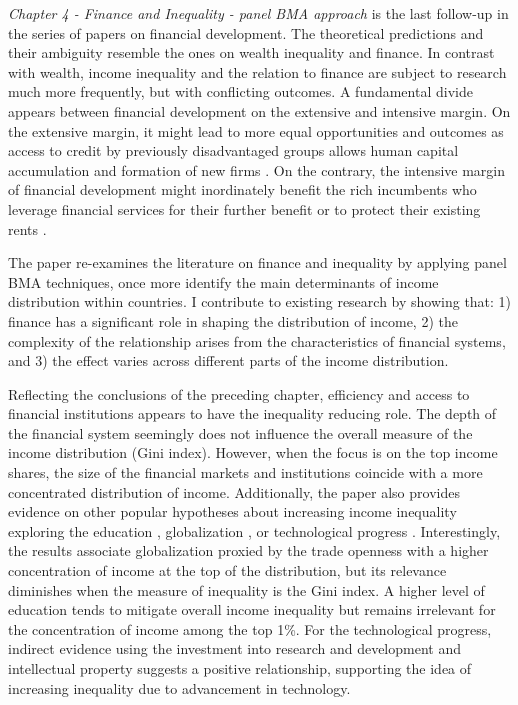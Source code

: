 \begin{refsection}
\emph{Chapter 4 - Finance and Inequality - panel BMA approach} is the last follow-up in the series of papers on financial development. The theoretical predictions and their ambiguity resemble the ones on wealth inequality and finance. In contrast with wealth, income inequality and the relation to finance are subject to research much more frequently, but with conflicting outcomes. A fundamental divide appears between financial development on the extensive and intensive margin. On the extensive margin, it might lead to more equal opportunities and outcomes as access to credit by previously disadvantaged groups allows human capital accumulation \parencite{braunetal2019,galormoav2004} and formation of new firms \parencite{banerjeenewman1990,evans1989estimated}. On the contrary, the intensive margin of financial development might inordinately benefit the rich incumbents who leverage financial services for their further benefit or to protect their existing rents \parencite{GreenwoodJovanovic1990,perotti2007investor}.

The paper re-examines the literature on finance and inequality by applying panel \ac{BMA} techniques, once more identify the main determinants of income distribution within countries. I contribute to existing research by showing that: 1) finance has a significant role in shaping the distribution of income, 2) the complexity of the relationship arises from the characteristics of financial systems, and 3) the effect varies across different parts of the income distribution. 

Reflecting the conclusions of the preceding chapter, efficiency and access to financial institutions appears to have the inequality reducing role. The depth of the financial system seemingly does not influence the overall measure of the income distribution (Gini index). However, when the focus is on the top income shares, the size of the financial markets and institutions coincide with a more concentrated distribution of income. Additionally, the paper also provides evidence on other popular hypotheses about increasing income inequality exploring the education \parencite{goldin2009race}, globalization \parencite{Jaumotte2013}, or technological progress \parencite{dabla2015causes}. Interestingly, the results associate globalization proxied by the trade openness with a higher concentration of income at the top of the distribution, but its relevance diminishes when the measure of inequality is the Gini index. A higher level of education tends to mitigate overall income inequality but remains irrelevant for the concentration of income among the top 1\%. For the technological progress, indirect evidence using the investment into research and development and intellectual property suggests a positive relationship, supporting the idea of increasing inequality due to advancement in technology.


\end{refsection}
